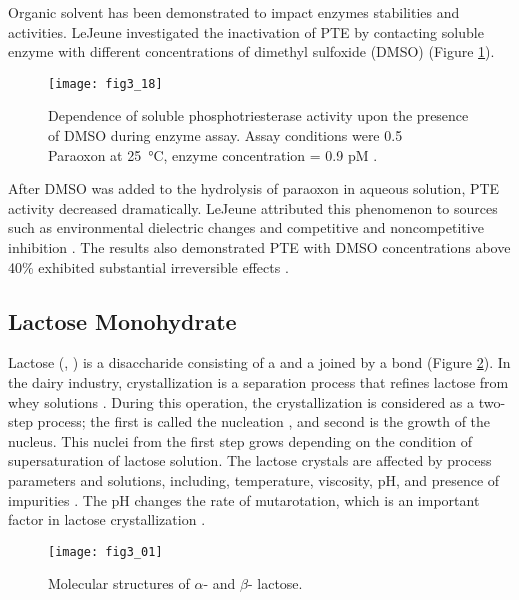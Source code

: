\begin{refsection}
Organic solvent has been demonstrated to impact enzymes stabilities and
activities. LeJeune  investigated the inactivation of PTE by
contacting soluble enzyme with different concentrations of dimethyl sulfoxide
(DMSO) \cite{Lejeune1997a} (Figure \ref{fig:pte-organic-inactive}).
\begin{figure}[htbp] \centering \texttt{[image: fig3\_18]}
    \caption[Dependence of soluble phosphotriesterase activity upon the
    presence of DMSO during enzyme assay. Assay conditions were
\SI{0.5}{\milli\Molar} Paraoxon at \SI{25}{\celsius}, enzyme concentration =
0.9 pM.]{Dependence of soluble phosphotriesterase activity upon the presence of
    DMSO during enzyme assay. Assay conditions were \SI{0.5}{\milli\Molar}
    Paraoxon at \SI{25}{\celsius}, enzyme concentration = 0.9 pM
    \cite{Lejeune1997a}.}
    \label{fig:pte-organic-inactive}
\end{figure}

After DMSO was added to the hydrolysis of paraoxon in
aqueous solution, PTE activity decreased dramatically. LeJeune 
attributed this phenomenon to sources such as environmental dielectric changes
and competitive and noncompetitive inhibition \cite{Lejeune1997a}. The results
also demonstrated PTE with DMSO concentrations above 40\% exhibited substantial
irreversible effects \cite{Lejeune1997a}.

\subsection{Lactose Monohydrate}

Lactose (,
) is a disaccharide consisting of a  and a
 joined by a  bond (Figure
\ref{fig:lactose-structure}). In the dairy industry, crystallization is a
separation process that refines lactose from whey solutions
\cite{Hourigan2013}. During this operation, the crystallization is considered
as a two-step process; the first is called the nucleation
\cite{Schmitt1999,Wong2014}, and second is the growth of the nucleus.  This
nuclei from the first step grows depending on the condition of supersaturation
of lactose solution.  The lactose crystals are affected by process parameters
and solutions, including, temperature, viscosity, pH, and presence of
impurities \cite{Bhargava1996}. The pH changes the rate of mutarotation, which
is an important factor in lactose crystallization \cite{Hourigan2013}. 
\begin{figure}[h!] \centering \texttt{[image: fig3\_01]}
    \caption[Molecular structures of $\alpha$- and $\beta$- lactose.]{Molecular
    structures of $\alpha$- and $\beta$- lactose.}
    \label{fig:lactose-structure}
\end{figure}


\end{refsection}
